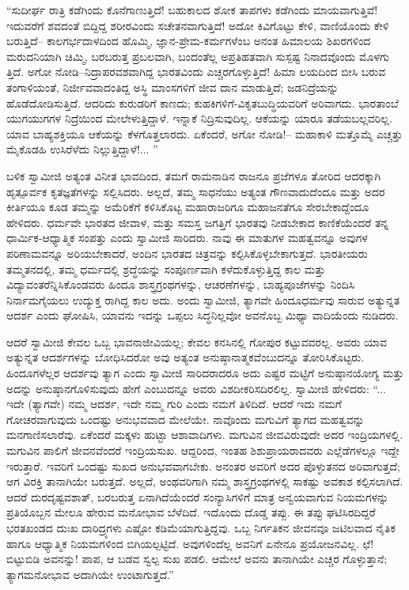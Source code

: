“ಸುದೀರ್ಘ ರಾತ್ರಿ ಕಡೆಗಿಂದು ಕೊನೆಗಾಣುತ್ತಿದೆ! ಬಹುಕಾಲದ ಶೋಕ ತಾಪಗಳು ಕಡೆಗಿಂದು ಮಾಯವಾಗುತ್ತಿವೆ! ಇದುವರೆಗೆ ಶವದಂತೆ ಬಿದ್ದಿದ್ದ ಶರೀರವಿಂದು ಸಚೇತನವಾಗುತ್ತಿದೆ! ಅದೋ ಕಿವಿಗೊಟ್ಟು ಕೇಳಿ, ವಾಣಿಯೊಂದು ಕೇಳಿ ಬರುತ್ತಿದೆ– ಕಾಲಗರ್ಭದಾಳದಿಂದ ಹೊಮ್ಮಿ, ಜ್ಞಾನ-ಪ್ರೇಮ-ಕರ್ಮಗಳೆಂಬ ಅನಂತ ಹಿಮಾಲಯ ಶಿಖರಗಳಿಂದ ಮರುದನಿಯಾಗಿ ಚಿಮ್ಮಿ, ಬರಬರುತ್ತ ಪ್ರಬಲವಾಗಿ, ಬಂದಂತೆಲ್ಲ ಅಪ್ರತಿಹತವಾಗಿ ಸುಸ್ಪಷ್ಟ ನಿನಾದವೊಂದು ಮೊಳಗು ತ್ತಿದೆ. ಅಗೋ ನೋಡಿ–ನಿದ್ರಾಪರವಶವಾಗಿದ್ದ ಭಾರತವಿಂದು ಎಚ್ಚರಗೊಳ್ಳುತ್ತಿದೆ! ಹಿಮಾ ಲಯದಿಂದ ಬೀಸಿ ಬರುವ ತಂಗಾಳಿಯಂತೆ, ನಿರ್ಜೀವವಾದಂತಿದ್ದ ಅಸ್ಥಿ ಮಾಂಸಗಳಿಗೆ ಜೀವ ದಾನ ಮಾಡುತ್ತಿದೆ; ಜಡನಿದ್ರೆಯನ್ನು ಹೊಡೆದೋಡಿಸುತ್ತಿದೆ. ಆದರಿದು ಕುರುಡರಿಗೆ ಕಾಣದು; ಕುಹಕಿಗಳಿಗೆ-ವಿಕೃತಬುದ್ಧಿಯವರಿಗೆ ಅರಿವಾಗದು. ಭಾರತಾಂಬೆ ಯುಗಯುಗಗಳ ನಿದ್ರೆಯಿಂದ ಮೇಲೇಳುತ್ತಿದ್ದಾಳೆ. ಇನ್ನಾಕೆ ನಿದ್ರಿಸುವುದಿಲ್ಲ. ಆಕೆಯನ್ನು ಯಾರೂ ತಡೆಯಬಲ್ಲವರಿಲ್ಲ. ಯಾವ ಬಾಹ್ಯಶಕ್ತಿಯೂ ಆಕೆಯನ್ನು ಕೆಳಗೊತ್ತಲಾರದು. ಏಕೆಂದರೆ, ಅಗೋ ನೋಡಿ!– ಮಹಾಕಾಳಿ ಮತ್ತೊಮ್ಮೆ ಎಚ್ಚತ್ತು ಮೈಕೊಡಹಿ ಉಸಿರೆಳೆದು ನಿಲ್ಲುತ್ತಿದ್ದಾಳೆ!... ”

ಬಳಿಕ ಸ್ವಾಮೀಜಿ ಅತ್ಯಂತ ವಿನೀತ ಭಾವದಿಂದ, ತಮಗೆ ರಾಮನಾಡಿನ ರಾಜನೂ ಪ್ರಜೆಗಳೂ ತೋರಿದ ಆದರಕ್ಕಾಗಿ ಹೃತ್ಪೂರ್ವಕ ಕೃತಜ್ಞತೆಗಳನ್ನು ಸಲ್ಲಿಸಿದರು. ಅಲ್ಲದೆ, ತಮ್ಮ ಸಾಧನೆಯು ಅತ್ಯಂತ ಗೌಣವಾದುದೆಂದೂ ಮತ್ತು ಅದರ ಕೀರ್ತಿಯೂ ಕೂಡ ತಮ್ಮನ್ನು ಅಮೆರಿಕೆಗೆ ಕಳಿಸಿಕೊಟ್ಟ ಮಹಾರಾಜರಿಗೂ ಮಹಾಜನತೆಗೂ ಸೇರಬೇಕಾದ್ದೆಂದೂ ಹೇಳಿದರು. ಧರ್ಮವೇ ಭಾರತದ ಜೀವಾಳ, ಮತ್ತು ಸಮಸ್ತ ಜಗತ್ತಿಗೆ ಭಾರತವು ನೀಡಬೇಕಾದ ಕಾಣಿಕೆಯೆಂದರೆ ತನ್ನ ಧಾರ್ಮಿಕ-ಆಧ್ಯಾತ್ಮಿಕ ಸಂಪತ್ತು ಎಂದು ಸ್ವಾಮೀಜಿ ಸಾರಿದರು. ನಾವು ಈ ಮಾತುಗಳ ಮಹತ್ವವನ್ನೂ ಅವುಗಳ ಪರಿಣಾಮವನ್ನೂ ಅರಿಯಬೇಕಾದರೆ, ಅಂದಿನ ಭಾರತದ ಚಿತ್ರವನ್ನು ಕಲ್ಪಿಸಿಕೊಳ್ಳಬೇಕಾಗುತ್ತದೆ. ಭಾರತೀಯರು ತಮ್ಮತನದಲ್ಲಿ, ತಮ್ಮ ಧರ್ಮದಲ್ಲಿ ಶ್ರದ್ಧೆಯನ್ನು ಸಂಪೂರ್ಣವಾಗಿ ಕಳೆದುಕೊಳ್ಳುತ್ತಿದ್ದ ಕಾಲ ಮತ್ತು ವಿದ್ಯಾವಂತರೆನ್ನಿಸಿಕೊಂಡವರು ಹಿಂದೂ ಶಾಸ್ತ್ರಗ್ರಂಥಗಳನ್ನು, ಆಚರಣೆಗಳನ್ನು, ಬಾಹ್ಯಪೂಜೆಗಳನ್ನು ನಿಂದಿಸಿ ನಿರ್ನಾಮಗೈಯಲು ಉದ್ಯುಕ್ತ ರಾಗಿದ್ದ ಕಾಲ ಅದು. ಅಂದು ಸ್ವಾಮೀಜಿ, ತ್ಯಾಗವೇ ಹಿಂದೂಧರ್ಮವು ಸಾರುವ ಅತ್ಯುನ್ನತ ಆದರ್ಶ ಎಂದು ಘೋಷಿಸಿ, ಯಾವನು ಇದನ್ನು ಒಪ್ಪಲು ಸಿದ್ಧನಿಲ್ಲವೋ ಅವನೊಬ್ಬ ಮಿಥ್ಯಾ ವಾದಿಯೆಂದು ನುಡಿದರು.

ಆದರೆ ಸ್ವಾಮೀಜಿ ಕೇವಲ ಒಬ್ಬ ಭಾವನಾಜೀವಿಯಲ್ಲ; ಕೇವಲ ಕನಸಿನಲ್ಲಿ ಗೋಪುರ ಕಟ್ಟುವವರಲ್ಲ. ಅವರು ಯಾವ ಅತ್ಯುನ್ನತ ಆದರ್ಶಗಳನ್ನು ಬೋಧಿಸಿದರೋ ಅವು ಅತ್ಯಂತ ಅನುಷ್ಠಾನಾತ್ಮಕವೆಂಬುದನ್ನೂ ತೋರಿಸಿಕೊಟ್ಟರು. ಹಿಂದೂಗಳೆಲ್ಲರ ಆದರ್ಶವು ತ್ಯಾಗ ಎಂದು ಸ್ವಾಮೀಜಿ ಸಾರಿದರಾದರೂ ಅದು ಎಷ್ಟರ ಮಟ್ಟಿಗೆ ಅನುಷ್ಠಾನಯೋಗ್ಯ ಮತ್ತು ಅದನ್ನು ಅನುಷ್ಠಾನಗೊಳಿಸುವುದು ಹೇಗೆ ಎಂಬುದನ್ನೂ ಅವರು ವಿಶದೀಕರಿಸದಿರಲಿಲ್ಲ. ಸ್ವಾಮೀಜಿ ಹೇಳಿದರು: “... ಇದೇ (ತ್ಯಾಗವೇ) ನಮ್ಮ ಆದರ್ಶ, ಇದೇ ನಮ್ಮ ಗುರಿ ಎಂದು ನಮಗೆ ತಿಳಿದಿದೆ. ಆದರೆ ಇದು ನಮಗೆ ಗೋಚರವಾಗುವುದು ಒಂದಷ್ಟು ಅನುಭವವಾದ ಮೇಲೆಯೇ. ನಾವೊಂದು ಮಗುವಿಗೆ ತ್ಯಾಗದ ಮಹತ್ವವನ್ನು ಮನಗಾಣಿಸಲಾರೆವು. ಏಕೆಂದರೆ ಮಕ್ಕಳು ಹುಟ್ಟಾ ಆಶಾವಾದಿಗಳು. ಮಗುವಿನ ಜೀವವಿರುವುದೇ ಅದರ ಇಂದ್ರಿಯಗಳಲ್ಲಿ. ಮಗುವಿನ ಪಾಲಿಗೆ ಜೀವನವೆಂದರೆ ಇಂದ್ರಿಯಸುಖ. ಆದ್ದರಿಂದ, ಇಂತಹ ಶಿಶುಪ್ರಾಯರಾದವರು ಎಲ್ಲೆಡೆಗಳಲ್ಲೂ ಇದ್ದೇ ಇರುತ್ತಾರೆ. ಇವರಿಗೆ ಒಂದಷ್ಟು ಸುಖದ ಅನುಭವವಾಗಬೇಕು. ಅನಂತರ ಅವರಿಗೆ ಅದರ ಪೊಳ್ಳುತನದ ಅರಿವಾಗುತ್ತದೆ; ಆಗ ವಿರಕ್ತಿ ತಾನಾಗಿಯೇ ಬರುತ್ತದೆ. ಅಲ್ಲದೆ, ಅಂಥವರಿಗಾಗಿ ನಮ್ಮ ಶಾಸ್ತ್ರಗ್ರಂಥಗಳಲ್ಲಿ ಸಾಕಷ್ಟು ಅವಕಾಶ ಕಲ್ಪಿಸಲಾಗಿದೆ. ಆದರೆ ದುರದೃಷ್ಟವಶಾತ್, ಬರಬರುತ್ತ ಏನಾಗಿದೆಯೆಂದರೆ ಸಂನ್ಯಾಸಿಗಳಿಗೆ ಮಾತ್ರ ಅನ್ವಯವಾಗುವ ನಿಯಮಗಳನ್ನು ಪ್ರತಿಯೊಬ್ಬನ ಮೇಲೂ ಹೇರುವ ಮನೋಭಾವ ಬೆಳೆದಿದೆ. ಇದೊಂದು ದೊಡ್ಡ ತಪ್ಪು. ಈ ತಪ್ಪು ಘಟಿಸಿರದಿದ್ದರೆ ಭರತಖಂಡದ ದುಃಖ ದಾರಿದ್ರ್ಯಗಳು ಎಷ್ಟೋ ಕಡಿಮೆಯಾಗುತ್ತಿದ್ದವು. ಒಬ್ಬ ನಿರ್ಗತಿಕನ ಜೀವನವೂ ಜಟಿಲವಾದ ನೈತಿಕ ಹಾಗೂ ಆಧ್ಯಾತ್ಮಿಕ ನಿಯಮಗಳಿಂದ ಬಿಗಿಯಲ್ಪಟ್ಟಿದೆ. ಅವುಗಳಿಂದೆಲ್ಲ ಅವನಿಗೆ ಏನೇನೂ ಪ್ರಯೋಜನವಿಲ್ಲ. ಛೆ! ಬಿಟ್ಟುಬಿಡಿ ಅವನನ್ನು! ಪಾಪ, ಆ ಬಡವ ಸ್ವಲ್ಪ ಸುಖ ಪಡಲಿ. ಆಮೇಲೆ ಅವನು ತಾನಾಗಿಯೇ ಎಚ್ಚರ ಗೊಳ್ಳುತ್ತಾನೆ; ತ್ಯಾಗಮನೋಭಾವ ಅದಾಗಿಯೇ ಉಂಟಾಗುತ್ತದೆ.”

